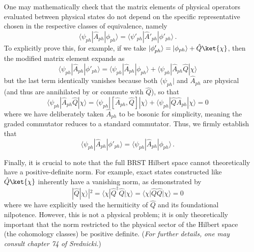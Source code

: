 One may mathematically check that the matrix elements of physical operators evaluated between physical states do not depend on the specific representative chosen in the respective classes of equivalence, namely
\begin{equation} \label{eq:matrix_element_equivalence}
    \langle \psi_{ph} | \hat{A}_{ph} | \phi_{ph} \rangle = \langle \psi'_{ph} | \hat{A}'_{ph} | \phi'_{ph} \rangle \, .
\end{equation}
To explicitly prove this, for example, if we take \(\vert{}\phi'_{ph}\rangle = \vert{}\phi_{ph}\rangle + \hat{Q}\ket{\chi}\), then the modified matrix element expands as
\begin{equation} \label{eq:matrix_expansion}
    \langle \psi_{ph} | \hat{A}_{ph} | \phi'_{ph} \rangle = \langle \psi_{ph} | \hat{A}_{ph} | \phi_{ph} \rangle + \langle \psi_{ph} | \hat{A}_{ph} \hat{Q} | \chi \rangle
\end{equation}
but the last term identically vanishes because both \(\langle \psi_{ph}\vert{}\) and \(\hat{A}_{ph}\) are physical (and thus are annihilated by or commute with \(\hat{Q}\)), so that
\begin{equation} \label{eq:matrix_vanishing_term}
    \langle \psi_{ph} | \hat{A}_{ph} \hat{Q} | \chi \rangle = \langle \psi_{ph} | [\hat{A}_{ph}, \hat{Q}] | \chi \rangle + \langle \psi_{ph} | \hat{Q} \hat{A}_{ph} | \chi \rangle = 0
\end{equation}
where we have deliberately taken \(\hat{A}_{ph}\) to be bosonic for simplicity, meaning the graded commutator reduces to a standard commutator. Thus, we firmly establish that
\begin{equation} \label{eq:matrix_final_equivalence}
    \langle \psi_{ph} | \hat{A}_{ph} | \phi'_{ph} \rangle = \langle \psi_{ph} | \hat{A}_{ph} | \phi_{ph} \rangle \, .
\end{equation}

Finally, it is crucial to note that the full BRST Hilbert space cannot theoretically have a positive-definite norm. For example, exact states constructed like \(\hat{Q}\ket{\chi}\) inherently have a vanishing norm, as demonstrated by
\begin{equation} \label{eq:vanishing_norm}
    |\hat{Q}|\chi\rangle|^2 = \langle \chi | \hat{Q}^\dagger \hat{Q} | \chi \rangle = \langle \chi | \hat{Q}\hat{Q} | \chi \rangle = 0
\end{equation}
where we have explicitly used the hermiticity of \(\hat{Q}\) and its foundational nilpotence. However, this is not a physical problem; it is only theoretically important that the norm restricted to the physical sector of the Hilbert space (the cohomology classes) be positive definite. (\textit{For further details, one may consult chapter 74 of Srednicki.})

